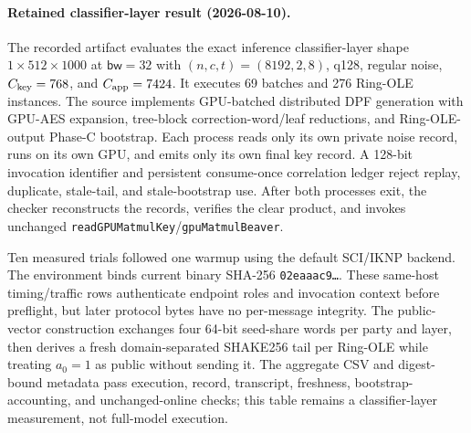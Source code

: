 \documentclass[11pt]{article}
\newcommand{\bw}{\mathsf{bw}}
\begin{document}
\paragraph{Retained classifier-layer result (2026-08-10).}
The recorded artifact evaluates the exact inference classifier-layer shape
$1{\times}512{\times}1000$ at $\bw=32$ with
$(n,c,t)=(8192,2,8)$, q128, regular noise, $C_{\rm key}=768$, and
$C_{\rm app}=7424$. It executes 69 batches and 276 Ring-OLE instances.
The source implements GPU-batched distributed DPF generation with GPU-AES
expansion, tree-block correction-word/leaf reductions, and Ring-OLE-output
Phase-C bootstrap. Each process reads only its own private noise record, runs
on its own GPU, and emits only its own final key record. A 128-bit invocation
identifier and persistent consume-once correlation ledger reject replay,
duplicate, stale-tail, and stale-bootstrap use. After both processes exit, the
checker reconstructs the records, verifies the clear product, and invokes
unchanged \texttt{readGPUMatmulKey}/\texttt{gpuMatmulBeaver}.

Ten measured trials followed one warmup using the default SCI/IKNP backend.
The environment binds current binary SHA-256 \texttt{02eaaac9\ldots}. These
same-host timing/traffic rows authenticate endpoint roles and invocation
context before preflight, but later protocol bytes have no per-message
integrity. The public-vector construction exchanges four 64-bit seed-share
words per party and layer, then derives a fresh domain-separated SHAKE256 tail
per Ring-OLE while
treating $a_0=1$ as public without sending it. The aggregate CSV and
digest-bound metadata pass execution, record, transcript, freshness,
bootstrap-accounting, and unchanged-online checks; this table remains a
classifier-layer measurement, not full-model execution.
\end{document}
